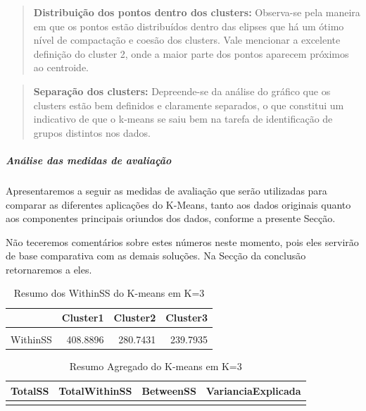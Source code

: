 \documentclass[
  letterpaper,
  DIV=11,
  numbers=noendperiod]{scrartcl}
\let\oldsubparagraph\subparagraph
\renewcommand{\subparagraph}[1]{\oldsubparagraph{#1}\mbox{}}
\begin{document}
\begin{quote}
\textbf{Distribuição dos pontos dentro dos clusters:} Observa-se pela
maneira em que os pontos estão distribuídos dentro das elipses que há um
ótimo nível de compactação e coesão dos clusters. Vale mencionar a
excelente definição do cluster 2, onde a maior parte dos pontos aparecem
próximos ao centroide.
\end{quote}

\begin{quote}
\textbf{Separação dos clusters:} Depreende-se da análise do gráfico que
os clusters estão bem definidos e claramente separados, o que constitui
um indicativo de que o k-means se saiu bem na tarefa de identificação de
grupos distintos nos dados.
\end{quote}

\newpage{}

\subparagraph{Análise das medidas de
avaliação}\label{anuxe1lise-das-medidas-de-avaliauxe7uxe3o}

Apresentaremos a seguir as medidas de avaliação que serão utilizadas
para comparar as diferentes aplicações do K-Means, tanto aos dados
originais quanto aos componentes principais oriundos dos dados, conforme
a presente Secção.

Não teceremos comentários sobre estes números neste momento, pois eles
servirão de base comparativa com as demais soluções. Na Secção da
conclusão retornaremos a eles.

\begingroup\fontsize{12}{14}\selectfont

\begin{longtable}[t]{lrrr}
\caption{\label{tab:unnamed-chunk-30}Resumo dos WithinSS do K-means em K=3}\\
\toprule
  & Cluster1 & Cluster2 & Cluster3\\
\midrule
\cellcolor{gray!15}{Cluster} & \cellcolor{gray!15}{1.0000} & \cellcolor{gray!15}{2.0000} & \cellcolor{gray!15}{3.0000}\\
WithinSS & 408.8896 & 280.7431 & 239.7935\\
\bottomrule
\end{longtable}
\endgroup{}

\begingroup\fontsize{12}{14}\selectfont

\begin{longtable}[t]{rrrr}
\caption{\label{tab:unnamed-chunk-30}Resumo Agregado do K-means em K=3}\\
\toprule
TotalSS & TotalWithinSS & BetweenSS & VarianciaExplicada\\
\midrule
\cellcolor{gray!15}{1958.108} & \cellcolor{gray!15}{929.4262} & \cellcolor{gray!15}{1028.681} & \cellcolor{gray!15}{52.53447}\\
\bottomrule
\end{longtable}
\endgroup{}
\end{document}
